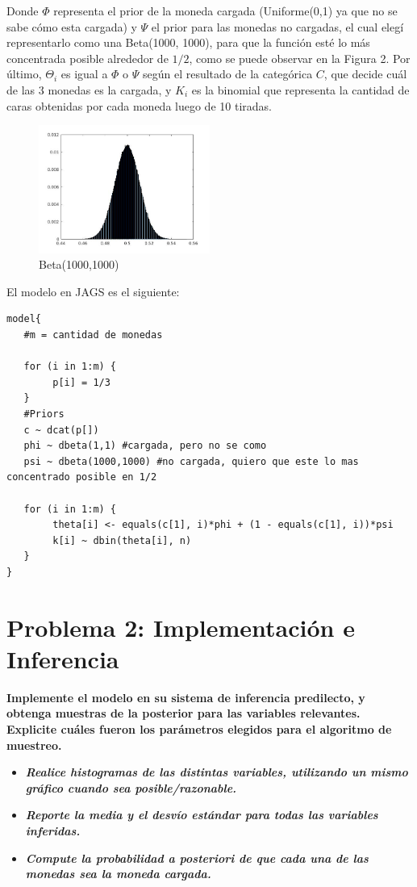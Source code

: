 Donde $\Phi$ representa el prior de la moneda cargada (Uniforme(0,1) ya que no se sabe cómo esta cargada) y $\Psi$ el prior para las monedas no cargadas, el cual elegí representarlo
como una Beta(1000, 1000), para que la función esté lo más concentrada posible alrededor de $1/2$, como se puede observar en la Figura 2. Por último, $\Theta_{i}$ es igual a $\Phi$ o $\Psi$ según
el resultado de la categórica $C$, que decide cuál de las 3 monedas es la cargada, y $K_{i}$ es la binomial que representa la cantidad de caras obtenidas por cada moneda luego de 10 tiradas.

\begin{figure}[h!]
  \centering
    \includegraphics[width=0.5\textwidth]{imagenes/beta-1000-1000.jpg}
  \caption{Beta(1000,1000)}
\end{figure}


\newpage
El modelo en JAGS es el siguiente:
\begin{verbatim}
model{
   #m = cantidad de monedas

   for (i in 1:m) {
   		p[i] = 1/3
   }
   #Priors
   c ~ dcat(p[])
   phi ~ dbeta(1,1) #cargada, pero no se como
   psi ~ dbeta(1000,1000) #no cargada, quiero que este lo mas concentrado posible en 1/2

   for (i in 1:m) {
   		theta[i] <- equals(c[1], i)*phi + (1 - equals(c[1], i))*psi
   		k[i] ~ dbin(theta[i], n)
   }
}
\end{verbatim}

\newpage
\section{Problema 2: Implementación e Inferencia}

\textbf{Implemente el modelo en su sistema de inferencia predilecto, y obtenga muestras de la posterior para las variables relevantes. Explicite cuáles fueron los parámetros
elegidos para el algoritmo de muestreo.}

\begin{itemize}
 \item \textbf{\textit{Realice histogramas de las distintas variables, utilizando un mismo gráfico cuando sea posible/razonable.}}
 \item \textbf{\textit{Reporte la media y el desvío estándar para todas las variables inferidas.}}
 \item \textbf{\textit{Compute la probabilidad a posteriori de que cada una de las monedas sea la moneda cargada.}}
\end{itemize}


